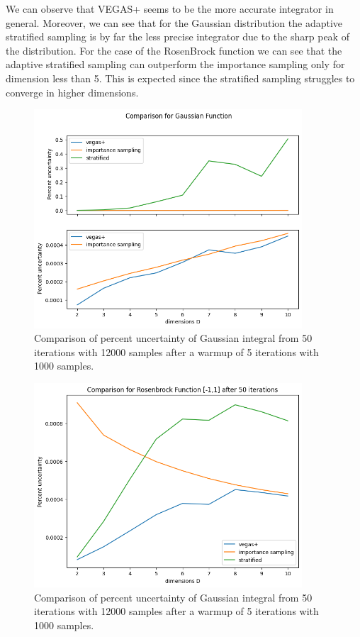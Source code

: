 \documentclass[../main/main.tex]{subfiles}
\begin{document}
We can observe that VEGAS+ seems to be the more accurate integrator in general. Moreover, we can see that for the Gaussian distribution the adaptive stratified sampling is by far the less precise integrator due to the sharp peak of the distribution. For the case of the RosenBrock \cite{10.1093/comjnl/3.3.175} function  we can see that the adaptive stratified sampling can outperform the importance sampling only for dimension less than 5. This is expected since the stratified sampling struggles to converge in higher dimensions.

\begin{figure}[h]
	\centering
	\includegraphics[width=10cm]{../../../tests/plots/gauss_dims_2.png}
	\caption{Comparison of  percent uncertainty of Gaussian integral  from 50 iterations with 12000 samples after a warmup of 5 iterations with 1000 samples. }
	\label{gauss_dim}
\end{figure}

\begin{figure}[h]
	\centering
	\includegraphics[width=10cm]{../../../tests/plots/rosen_dims_final.png}
	\caption{Comparison of  percent uncertainty of Gaussian integral  from 50 iterations with 12000 samples after a warmup of 5 iterations with 1000 samples. }
	\label{rosen_dims}
\end{figure}
\end{document}
